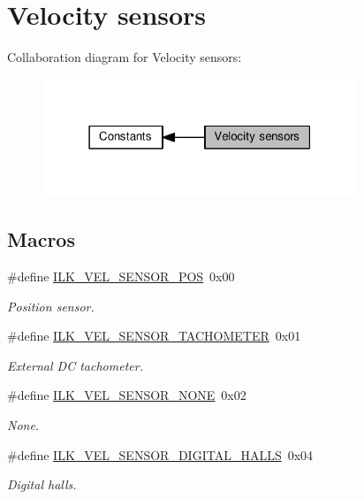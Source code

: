 \hypertarget{group__IL__CONST__VEL__SENSOR}{}\section{Velocity sensors}
\label{group__IL__CONST__VEL__SENSOR}
Collaboration diagram for Velocity sensors\+:\nopagebreak
\begin{figure}[H]
\begin{center}
\leavevmode
\includegraphics[width=267pt]{group__IL__CONST__VEL__SENSOR}
\end{center}
\end{figure}
\subsection*{Macros}
\begin{DoxyCompactItemize}
\item 
\#define \hyperlink{group__IL__CONST__VEL__SENSOR_ga84b8ae078f55b0fe678b42ba33ecbffb}{I\+L\+K\+\_\+\+V\+E\+L\+\_\+\+S\+E\+N\+S\+O\+R\+\_\+\+P\+OS}~0x00
\begin{DoxyCompactList}\small\item\em Position sensor. \end{DoxyCompactList}\item 
\#define \hyperlink{group__IL__CONST__VEL__SENSOR_ga5e2000096458f2759519f81411f2f25e}{I\+L\+K\+\_\+\+V\+E\+L\+\_\+\+S\+E\+N\+S\+O\+R\+\_\+\+T\+A\+C\+H\+O\+M\+E\+T\+ER}~0x01
\begin{DoxyCompactList}\small\item\em External DC tachometer. \end{DoxyCompactList}\item 
\#define \hyperlink{group__IL__CONST__VEL__SENSOR_gadf37b8bf88afd7b938ac2edf99474553}{I\+L\+K\+\_\+\+V\+E\+L\+\_\+\+S\+E\+N\+S\+O\+R\+\_\+\+N\+O\+NE}~0x02
\begin{DoxyCompactList}\small\item\em None. \end{DoxyCompactList}\item 
\#define \hyperlink{group__IL__CONST__VEL__SENSOR_ga245f70defaf3b4a986ef63ae406db0df}{I\+L\+K\+\_\+\+V\+E\+L\+\_\+\+S\+E\+N\+S\+O\+R\+\_\+\+D\+I\+G\+I\+T\+A\+L\+\_\+\+H\+A\+L\+LS}~0x04
\begin{DoxyCompactList}\small\item\em Digital halls. \end{DoxyCompactList}\end{DoxyCompactItemize}


